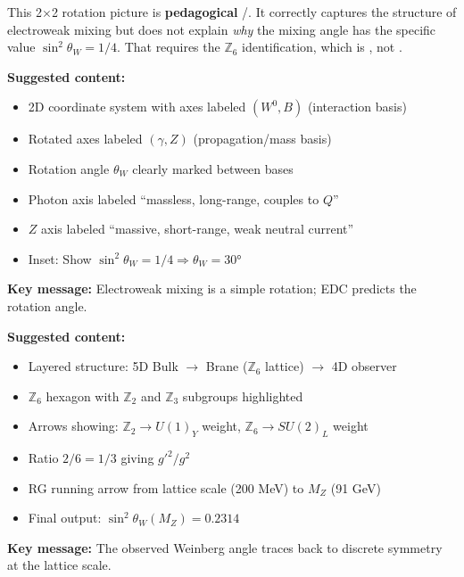 \begin{tcolorbox}[colback=yellow!5!white, colframe=yellow!60!black,
    title=\textbf{Toy Model Status}]
This 2$\times$2 rotation picture is \textbf{pedagogical} \tagM{}/\tagP{}.
It correctly captures the structure of electroweak mixing but does not explain
\emph{why} the mixing angle has the specific value $\sin^2\theta_W = 1/4$.
That requires the $\mathbb{Z}_6$ identification, which is \tagI{}, not \tagDc{}.
\end{tcolorbox}


\begin{tcolorbox}[colback=gray!10, colframe=gray!50, title=\textbf{Figure Placeholder 1: Mixing Geometry --- Basis Rotation}]
\textbf{Suggested content:}
\begin{itemize}[nosep]
    \item 2D coordinate system with axes labeled $(W^0, B)$ (interaction basis)
    \item Rotated axes labeled $(\gamma, Z)$ (propagation/mass basis)
    \item Rotation angle $\theta_W$ clearly marked between bases
    \item Photon axis labeled ``massless, long-range, couples to $Q$''
    \item $Z$ axis labeled ``massive, short-range, weak neutral current''
    \item Inset: Show $\sin^2\theta_W = 1/4 \Rightarrow \theta_W = 30°$
\end{itemize}
\textbf{Key message:} Electroweak mixing is a simple rotation; EDC predicts the rotation angle.
\end{tcolorbox}

\begin{tcolorbox}[colback=gray!10, colframe=gray!50, title=\textbf{Figure Placeholder 2: EDC 5D $\to$ 4D Projection Map}]
\textbf{Suggested content:}
\begin{itemize}[nosep]
    \item Layered structure: 5D Bulk $\to$ Brane ($\mathbb{Z}_6$ lattice) $\to$ 4D observer
    \item $\mathbb{Z}_6$ hexagon with $\mathbb{Z}_2$ and $\mathbb{Z}_3$ subgroups highlighted
    \item Arrows showing: $\mathbb{Z}_2 \to U(1)_Y$ weight, $\mathbb{Z}_6 \to SU(2)_L$ weight
    \item Ratio $2/6 = 1/3$ giving $g'^2/g^2$
    \item RG running arrow from lattice scale (200 MeV) to $M_Z$ (91 GeV)
    \item Final output: $\sin^2\theta_W(M_Z) = 0.2314$
\end{itemize}
\textbf{Key message:} The observed Weinberg angle traces back to discrete symmetry at the lattice scale.
\end{tcolorbox}

